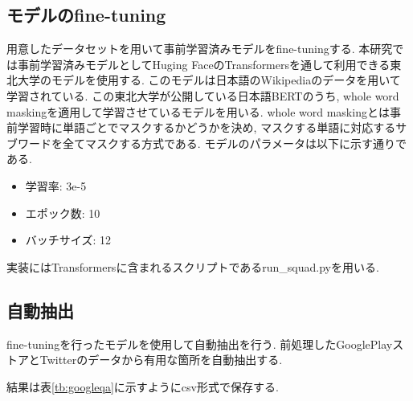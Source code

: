 \subsection{モデルのfine-tuning}
用意したデータセットを用いて事前学習済みモデルをfine-tuningする. 本研究では事前学習済みモデルとしてHuging FaceのTransformersを通して利用できる東北大学のモデル\cite{tohoku}を使用する. このモデルは日本語のWikipediaのデータを用いて学習されている\cite{tohoku}. 
この東北大学が公開している日本語BERTのうち, whole word maskingを適用して学習させているモデル\cite{masking}を用いる. whole word maskingとは事前学習時に単語ごとでマスクするかどうかを決め, マスクする単語に対応するサブワードを全てマスクする方式である. モデルのパラメータは以下に示す通りである. 
\begin{itemize}
  \item 学習率: 3e-5
  \item エポック数: 10
  \item バッチサイズ: 12
\end{itemize}

実装にはTransformersに含まれるスクリプトであるrun\_squad.pyを用いる. 

\subsection{自動抽出}
fine-tuningを行ったモデルを使用して自動抽出を行う. 前処理したGooglePlayストアとTwitterのデータから有用な箇所を自動抽出する. 

結果は表\ref{tb:googleqa}に示すようにcsv形式で保存する. 

